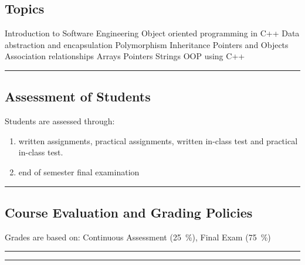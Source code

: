 \subsection*{Topics}
\begin{outline}
    \1 Introduction to Software Engineering
    \1 Object oriented programming in C++
    \1 Data abstraction and encapsulation
    \1 Polymorphism
    \1 Inheritance
    \1 Pointers and Objects
    \1 Association relationships
    \1 Arrays
    \1 Pointers
    \1 Strings
    \1 OOP using C++
\end{outline}
\vspace{2ex} \hrule\vspace{2ex}

\subsection*{Assessment of Students}
Students are assessed through:
    \begin{enumerate}
        \item written assignments, practical assignments, written in-class test and practical in-class test.
        \item end of semester final examination
    \end{enumerate}
\vspace{2ex}\hrule\vspace{2ex}

\subsection*{Course Evaluation and Grading Policies}
Grades are based on:
Continuous Assessment (\qty{25}{\percent}),
Final Exam (\qty{75}{\percent})

\vspace{2ex}\hrule
\vspace{2ex}\hrule\vspace{2ex}